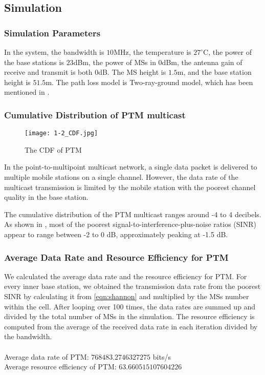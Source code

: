 \documentclass[conference]{IEEEtran}
\begin{document}
\subsection{Simulation}
\subsubsection{Simulation Parameters}
In the system, the bandwidth is $10$MHz, the temperature is $27^\circ$C, the power of the base stations is $23$dBm, the power of MSs in $0$dBm, the antenna gain of receive and transmit is both $0$dB. The MS height is $1.5$m, and the base station height is $51.5$m. The path loss model is Two-ray-ground model, which has been mentioned in .
\subsubsection{Cumulative Distribution of PTM multicast}

\begin{figure}[htbp]
    \centering
    \texttt{[image: 1-2\_CDF.jpg]}
    \caption{The CDF of PTM}
    \label{fig:PTM_CDF}
\end{figure}
In the point-to-multipoint multicast network, a single data packet is delivered to multiple mobile stations on a single channel. However, the data rate of the multicast transmission is limited by the mobile station with the poorest channel quality in the base station.

The cumulative distribution of the PTM multicast ranges around -4 to 4 decibels. As shown in , most of the poorest signal-to-interference-plus-noise ratios (SINR) appear to range between -2 to 0 dB, approximately peaking at -1.5 dB.

\subsubsection{Average Data Rate and Resource Efficiency for PTM}
We calculated the average data rate and the resource efficiency for PTM. For every inner base station, we obtained the transmission data rate from the poorest SINR by calculating it from \cref{eqn:shannon} and multiplied by the MSs number within the cell. After looping over 100 times, the data rates are summed up and divided by the total number of MSs in the simulation. The resource efficiency is computed from the average of the received data rate in each iteration divided by the bandwidth.
\\
\\
Average data rate of PTM: $768483.2746327275$ bits/s\\
Average resource efficiency of PTM: $63.660515107604226$
\end{document}
